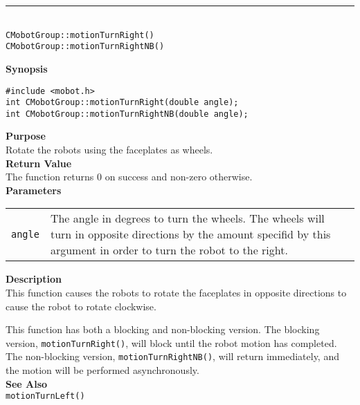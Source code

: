 \noindent
\vspace{5pt}
\rule{4.5in}{0.015in}\\
\noindent
{\LARGE \texttt{CMobotGroup::motionTurnRight()}}\\
{\LARGE \texttt{CMobotGroup::motionTurnRightNB()}}\\
{}

\noindent
{\bf Synopsis}
\vspace{-8pt}
\begin{verbatim}
#include <mobot.h>
int CMobotGroup::motionTurnRight(double angle);
int CMobotGroup::motionTurnRightNB(double angle);
\end{verbatim}

\noindent
{\bf Purpose}\\
Rotate the robots using the faceplates as wheels.\\

\noindent
{\bf Return Value}\\
The function returns 0 on success and non-zero otherwise.\\

\noindent
{\bf Parameters}\\
\vspace{-0.1in}
\begin{description}
\item               
\begin{tabular}{p{10 mm}p{145 mm}}
\texttt{angle} & The angle in degrees to turn the wheels. The wheels will turn in opposite directions by the amount specifid by this argument in order to turn the robot to the right. \\
\end{tabular}
\end{description}

\noindent
{\bf Description}\\
This function causes the robots to rotate the faceplates in opposite directions
to cause the robot to rotate clockwise.

This function has both a blocking and non-blocking version.
The blocking version, \texttt{motionTurnRight()}, will block until the
robot motion has completed. The non-blocking version, \texttt{motionTurnRightNB()},
will return immediately, and the motion will be performed asynchronously.\\

\noindent
{\bf See Also}\\
\texttt{motionTurnLeft()}

